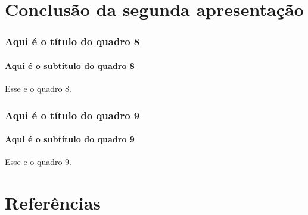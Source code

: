 \documentclass[aspectratio=169]{beamer}
\begin{document}
		\section[Conclusão]{Conclusão da segunda apresentação}
			\begin{frame}
				\frametitle{Aqui é o título do quadro 8}
				\framesubtitle{Aqui é o subtítulo do quadro 8}
				Esse e o quadro 8.
			\end{frame}
			\begin{frame}
				\frametitle{Aqui é o título do quadro 9}
				\framesubtitle{Aqui é o subtítulo do quadro 9}
				Esse e o quadro 9.
			\end{frame}
	
	\section*{Referências}
	\begin{frame}
		
		
	\end{frame}
\end{document}
